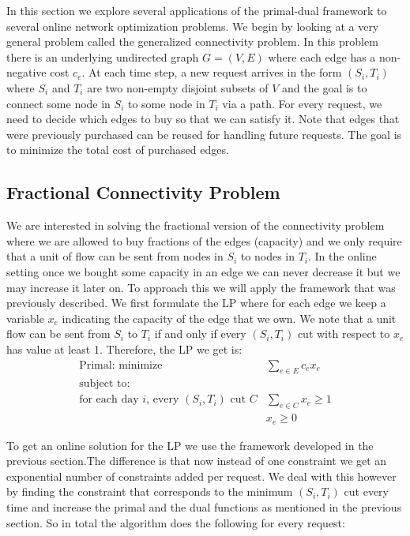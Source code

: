 In this section we explore several applications of the primal-dual framework to several online network optimization problems. We begin by looking at a very general problem called the generalized connectivity problem. In this problem there is an underlying undirected graph $G = (V,E)$ where each edge has a non-negative cost $c_e$. At each time step, a new request arrives in the form $(S_i,T_i)$ where $S_i$ and $T_i$ are two non-empty disjoint subsets of $V$ and the goal is to connect some node in $S_i$ to some node in $T_i$ via a path. For every request, we need to decide which edges to buy so that we can satisfy it. Note that edges that were previously purchased can be reused for handling future requests. The goal is to minimize the total cost of purchased edges.

\subsection{Fractional Connectivity Problem}

We are interested in solving the fractional version of the connectivity problem where we are allowed to buy fractions of the edges (capacity) and we only require that a unit of flow can be sent from nodes in $S_i$ to nodes in $T_i$. In the online setting once we bought some capacity in an edge we can never decrease it but we may increase it later on. To approach this we will apply the framework that was previously described. We first formulate the LP where for each edge we keep a variable $x_e$ indicating the capacity of the edge that we own. We note that a unit flow can be sent from $S_i$ to $T_i$ if and only if every $(S_i, T_i)$ cut with respect to $x_e$ has value at least 1. Therefore, the LP we get is: 
\[
	\begin{array}{lr}
	\textrm{Primal: minimize}   & \sum_{e \in E} c_e x_e   \\
	\textrm{subject to:} & \\
	\textrm{for each day $i$, every $(S_i,T_i)$ cut $C$} & \sum_{e \in C} x_e  \ge 1  \\
			    & x_e \geq 0
	\end{array}
\]

To get an online solution for the LP we use the framework developed in the previous section.The difference is that now instead of one constraint we get an exponential number of constraints added per request. We deal with this however by finding the constraint that corresponds to the minimum $(S_i,T_i)$ cut every time and increase the primal and the dual functions as mentioned in the previous section. So in total the algorithm does the following for every request:

